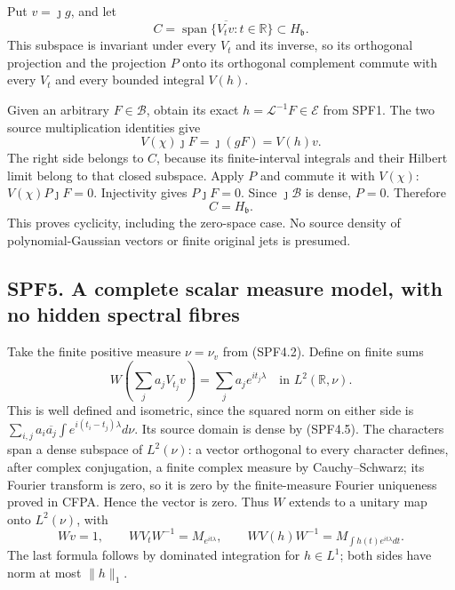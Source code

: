 Put \(v=\jmath g\), and let \[
C=\overline{\operatorname{span}\{V_tv:t\in\mathbb R\}}
\subset H_{\mathfrak b}.
\tag{SPF4.3}
\] This subspace is invariant under every \(V_t\) and its inverse, so
its orthogonal projection and the projection \(P\) onto its orthogonal
complement commute with every \(V_t\) and every bounded integral
\(V(h)\).

Given an arbitrary \(F\in\mathcal B\), obtain its exact
\(h=\mathcal L^{-1}F\in\mathcal E\) from SPF1. The two source
multiplication identities give \[
V(\chi)\jmath F=\jmath(gF)=V(h)v.
\tag{SPF4.4}
\] The right side belongs to \(C\), because its finite-interval
integrals and their Hilbert limit belong to that closed subspace. Apply
\(P\) and commute it with \(V(\chi)\): \(V(\chi)P\jmath F=0\).
Injectivity gives \(P\jmath F=0\). Since \(\jmath\mathcal B\) is dense,
\(P=0\). Therefore \[
\boxed{C=H_{\mathfrak b}.}
\tag{SPF4.5}
\] This proves cyclicity, including the zero-space case. No source
density of polynomial-Gaussian vectors or finite original jets is
presumed.

\subsection{SPF5. A complete scalar measure model, with no hidden
spectral
fibres}\label{spf5.-a-complete-scalar-measure-model-with-no-hidden-spectral-fibres}

Take the finite positive measure \(\nu=\nu_v\) from (SPF4.2). Define on
finite sums \[
W\left(\sum_j a_jV_{t_j}v\right)
=\sum_j a_je^{it_j\lambda}\quad\text{in }L^2(\mathbb R,\nu).
\tag{SPF5.1}
\] This is well defined and isometric, since the squared norm on either
side is \(\sum_{i,j}a_i\overline{a_j}\int e^{i(t_i-t_j)\lambda}d\nu\).
Its source domain is dense by (SPF4.5). The characters span a dense
subspace of \(L^2(\nu)\): a vector orthogonal to every character
defines, after complex conjugation, a finite complex measure by
Cauchy--Schwarz; its Fourier transform is zero, so it is zero by the
finite-measure Fourier uniqueness proved in CFPA. Hence the vector is
zero. Thus \(W\) extends to a unitary map onto \(L^2(\nu)\), with \[
Wv=1,\qquad WV_tW^{-1}=M_{e^{it\lambda}},\qquad
WV(h)W^{-1}=M_{\int h(t)e^{it\lambda}dt}.
\tag{SPF5.2}
\] The last formula follows by dominated integration for \(h\in L^1\);
both sides have norm at most \(\|h\|_1\).

